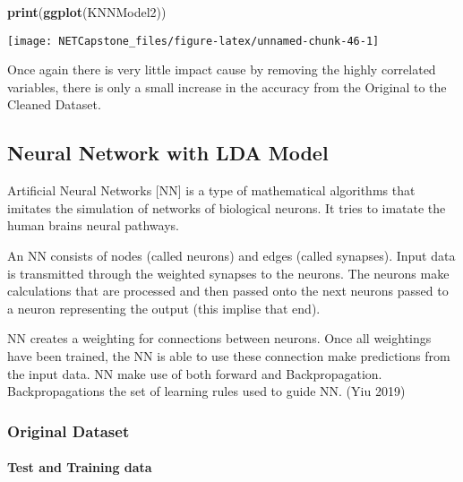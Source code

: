 \documentclass[
]{article}
\newenvironment{Shaded}{\begin{snugshade}}{\end{snugshade}}
\newcommand{\KeywordTok}[1]{\textcolor[rgb]{0.13,0.29,0.53}{\textbf{#1}}}
\newcommand{\NormalTok}[1]{#1}
\begin{document}
\begin{Shaded}
\begin{Highlighting}[]
\KeywordTok{print}\NormalTok{(}\KeywordTok{ggplot}\NormalTok{(KNNModel2))}
\end{Highlighting}
\end{Shaded}

\begin{center}\texttt{[image: NETCapstone\_files/figure-latex/unnamed-chunk-46-1]} \end{center}

Once again there is very little impact cause by removing the highly
correlated variables, there is only a small increase in the accuracy
from the Original to the Cleaned Dataset.

\hypertarget{neural-network-with-lda-model}{%
\subsection{Neural Network with LDA
Model}\label{neural-network-with-lda-model}}

Artificial Neural Networks {[}NN{]} is a type of mathematical algorithms
that imitates the simulation of networks of biological neurons. It tries
to imatate the human brains neural pathways.

An NN consists of nodes (called neurons) and edges (called synapses).
Input data is transmitted through the weighted synapses to the neurons.
The neurons make calculations that are processed and then passed onto
the next neurons passed to a neuron representing the output (this
implise that end).

NN creates a weighting for connections between neurons. Once all
weightings have been trained, the NN is able to use these connection
make predictions from the input data. NN make use of both forward and
Backpropagation. Backpropagations the set of learning rules used to
guide NN. (Yiu 2019)

\hypertarget{original-dataset-5}{%
\subsubsection{Original Dataset}\label{original-dataset-5}}

\hypertarget{test-and-training-data}{%
\paragraph{Test and Training data}\label{test-and-training-data}}
\end{document}

